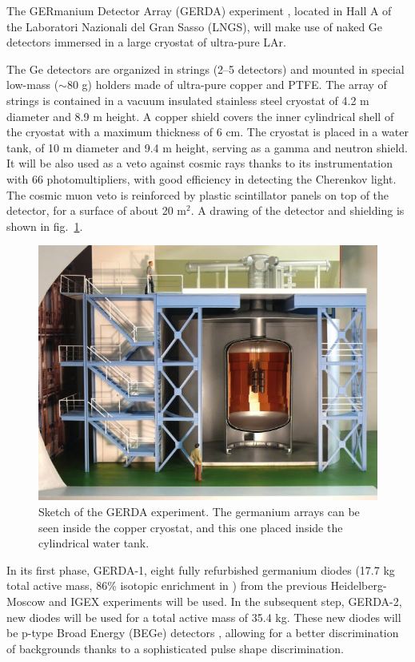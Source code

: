The GERmanium Detector Array (GERDA) experiment \cite{Abt:2004yk}, located in Hall A of the Laboratori Nazionali del Gran Sasso (LNGS), will make use of naked Ge detectors immersed in a large cryostat of ultra-pure LAr.

The Ge detectors are organized in strings (2--5 detectors) and mounted in special low-mass ($\sim 80$ g) holders made of ultra-pure copper and PTFE. The array of strings is contained in a vacuum insulated stainless steel cryostat of 4.2 m diameter and 8.9 m height. A copper shield covers the inner cylindrical shell of the cryostat with a maximum thickness of 6 cm. The cryostat is placed in a water tank, of 10 m diameter and 9.4 m height, serving as a gamma and neutron shield. It will be also used as a veto against cosmic rays thanks to its instrumentation with 66 photomultipliers, with good efficiency in detecting the Cherenkov light. The cosmic muon veto is reinforced by plastic scintillator panels on top of the detector, for a surface of about 20 m$^2$. A drawing of the detector and shielding is shown in fig.~\ref{fig:gerda}.

\begin{figure}[t!]
\begin{center}
\includegraphics[]{img/gerda.eps}
\end{center}
\caption{Sketch of the GERDA experiment. The germanium arrays can be seen inside the copper cryostat, and this one placed inside the cylindrical water tank.} \label{fig:gerda}
\end{figure}

In its first phase, GERDA-1, eight fully refurbished germanium diodes (17.7 kg total active mass, 86\% isotopic enrichment in \GE ) from the previous Heidelberg-Moscow and IGEX experiments will be used. In the subsequent step, GERDA-2, new diodes will be used for a total active mass of 35.4 kg. These new diodes will be p-type Broad Energy (BEGe) detectors \cite{Budjas:2008wb,Agostini:2010ke}, allowing for a better discrimination of backgrounds thanks to a sophisticated pulse shape discrimination.

